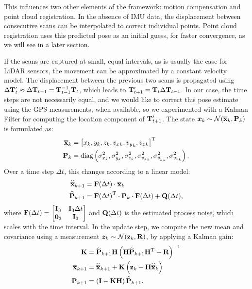 This influences two other elements of the framework: motion compensation and point cloud registration. In the absence of IMU data, the displacement between consecutive scans can be interpolated to correct individual points. Point cloud registration uses this predicted pose as an initial guess, for faster convergence, as we will see in a later section.

If the scans are captured at small, equal intervals, as is usually the case for LiDAR sensors, the movement can be approximated by a constant velocity model. The displacement between the previous two scans is propagated using
$\Delta \mathbf{T}_{t}' \approx \Delta \mathbf{T}_{t-1} = \mathbf{T}_{t-1}^{-1}\mathbf{T}_{t}$, which leads to
$\mathbf{T}_{t+1}' = \mathbf{T}_{t} \Delta \mathbf{T}_{t-1}$. In our case, the time steps are not necessarily equal, and we would like to correct this pose estimate using the GPS measurements, when available, so we experimented with a Kalman Filter for computing the location component of $\mathbf{T}_{t+1}'$. The state $\bm{x}_k \sim \mathcal{N}(\overline{\mathbf{x}}_{k}, \mathbf{P}_{k}) $ is formulated as:
\begin{align}
	\overline{\mathbf{x}}_{k} & = {\left[x_k, y_k, z_k, {v_x}_k, {v_y}_k, {v_z}_k\right]}^\text{T}                                                \\
	\mathbf{P}_{k} & = \text{diag}\left(\sigma^2_{x_k}, \sigma^2_{y_k}, \sigma^2_{z_k}, \sigma^2_{{v_x}_k}, \sigma^2_{{v_y}_k}, \sigma^2_{{v_z}_k}\right)\text{.}
\end{align}
Over a time step $\Delta t$, this changes according to a linear model:
\newcommand{\Fdt}{\matx{F}(\Delta t)}
\newcommand{\Qdt}{\matx{Q}(\Delta t)}
\begin{align}
	\kfxpred{k+1} & =  \Fdt \cdot \kfx{k}                              \\
	\kfPpred{k+1} & = \transpose{\Fdt} \cdot \kfP{k} \cdot \Fdt + \Qdt
	\comma
\end{align}
where
$
	\Fdt =
	\begin{bmatrix}
		\matx{I}_3 & \matx{I}_3 \Delta t \\
		\matx{0}_3 & \matx{I}_3
	\end{bmatrix}
$ and $\Qdt$ is the estimated process noise, which scales with the time interval. In the update step, we compute the new mean and covariance using a measurement $\bm{z}_k \sim \mathcal{N}(\mathbf{z}_k, \mathbf{R})$, by applying a Kalman gain:
\begin{align}
	\mathbf{K}  & = \widehat{\mathbf{P}}_{k+1} \mathbf{H} \left(\mathbf{H} \widehat{\mathbf{P}}_{k+1} {\mathbf{H}}^\text{T} + \mathbf{R}\right)^{-1} \\
	\overline{\mathbf{x}}_{k+1} & = \widehat{\overline{\mathbf{x}}}_{k+1} + \mathbf{K} \left(\mathbf{z}_k - \mathbf{H}\widehat{\overline{\mathbf{x}}}_{k} \right)                         \\
	\mathbf{P}_{k+1} & = \left(\mathbf{I} - \mathbf{K} \mathbf{H}\right) \widehat{\mathbf{P}}_{k+1}
	\text{.}
\end{align}

